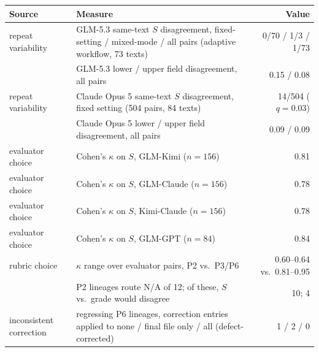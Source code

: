 \begin{tabular}{@{}llr@{}}
  \toprule
  Source & Measure & Value \\
  \midrule
  repeat variability & GLM-5.3 same-text $S$ disagreement, fixed-setting / mixed-mode / all pairs (adaptive workflow, 73 texts) & 0/70 / 1/3 / 1/73 \\
   & GLM-5.3 lower / upper field disagreement, all pairs & 0.15 / 0.08 \\
  repeat variability & Claude Opus 5 same-text $S$ disagreement, fixed setting (504 pairs, 84 texts) & 14/504 ($q{=}0.03$) \\
   & Claude Opus 5 lower / upper field disagreement, all pairs & 0.09 / 0.09 \\
  evaluator choice & Cohen's $\kappa$ on $S$, GLM-Kimi ($n{=}156$) & 0.81 \\
  evaluator choice & Cohen's $\kappa$ on $S$, GLM-Claude ($n{=}156$) & 0.78 \\
  evaluator choice & Cohen's $\kappa$ on $S$, Kimi-Claude ($n{=}156$) & 0.78 \\
  evaluator choice & Cohen's $\kappa$ on $S$, GLM-GPT ($n{=}84$) & 0.84 \\
  rubric choice & $\kappa$ range over evaluator pairs, P2 vs.\ P3/P6 & 0.60--0.64 vs.\ 0.81--0.95 \\
   & P2 lineages route N/A of 12; of these, $S$ vs.\ grade would disagree & 10; 4 \\
  inconsistent correction & regressing P6 lineages, correction entries applied to none / final file only / all (defect-corrected) & 1 / 2 / 0 \\
  \bottomrule
\end{tabular}
